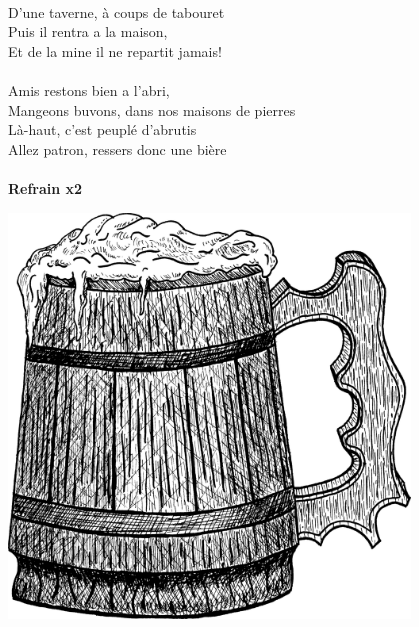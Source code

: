 \\D'une taverne, à coups de tabouret
\\Puis il rentra a la maison,
\\Et de la mine il ne repartit jamais!
\\\\Amis restons bien a l'abri,
\\Mangeons buvons, dans nos maisons de pierres
\\Là-haut, c'est peuplé d'abrutis
\\Allez patron, ressers donc une bière
\\\\\textbf{Refrain x2}
\bigskip
\bigskip
\begin{center}
\includegraphics[width=0.8\textwidth]{images/brev65.png}
\end{center}
\breakpage